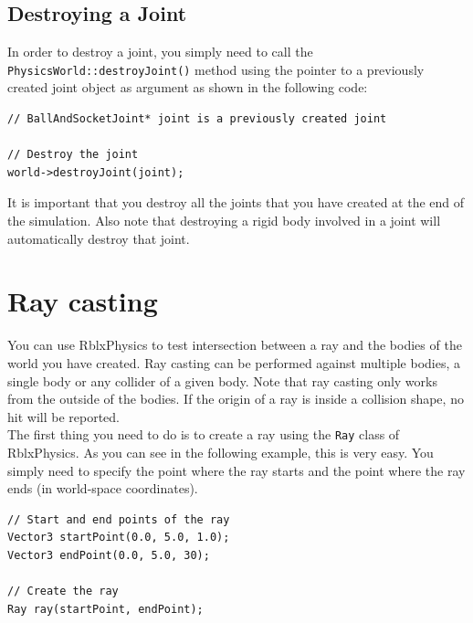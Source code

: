 \documentclass[a4paper,12pt]{article}
\begin{document}
    \subsection{Destroying a Joint}

    \begin{sloppypar}
    In order to destroy a joint, you simply need to call the \texttt{PhysicsWorld::destroyJoint()} method using the pointer to
    a previously created joint object as argument as shown in the following code: \\
   \end{sloppypar}

    \begin{lstlisting}
// BallAndSocketJoint* joint is a previously created joint

// Destroy the joint
world->destroyJoint(joint);
  \end{lstlisting}

    \vspace{0.6cm}

    It is important that you destroy all the joints that you have created at the end of the simulation. Also note that destroying a
    rigid body involved in a joint will automatically destroy that joint.

    \section{Ray casting}
    \label{sec:raycasting}

    You can use RblxPhysics to test intersection between a ray and the bodies of the world you have created. Ray casting can be performed against
    multiple bodies, a single body or any collider of a given body. Note that ray casting only works from the outside of the bodies. If the origin
    of a ray is inside a collision shape, no hit will be reported. \\

    The first thing you need to do is to create a ray using the \texttt{Ray} class of RblxPhysics. As you can see in the following example, this is
    very easy. You simply need to specify the point where the ray starts and the point where the ray ends (in world-space coordinates). \\

    \begin{lstlisting}
// Start and end points of the ray
Vector3 startPoint(0.0, 5.0, 1.0);
Vector3 endPoint(0.0, 5.0, 30);

// Create the ray
Ray ray(startPoint, endPoint);
  \end{lstlisting}
\end{document}
